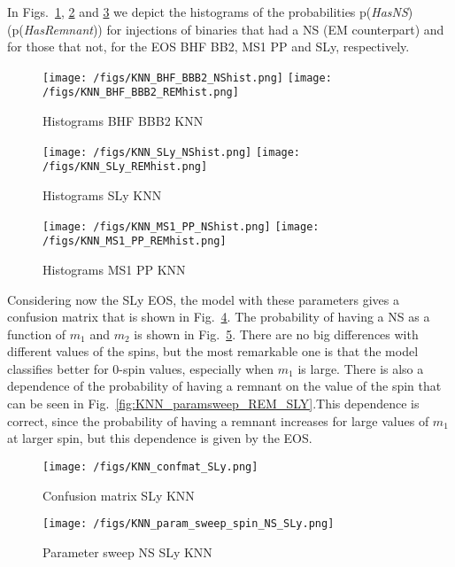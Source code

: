 

In Figs.~\ref{fig:KNN_hist_BHFBBB2}, \ref{fig:KNN_hist_SLY} and \ref{fig:KNN_hist_MS1PP}  we depict the histograms of the probabilities p(\textit{HasNS}) (p(\textit{HasRemnant})) for injections of binaries that had a NS (EM counterpart) and for those that not, for the EOS BHF BB2, MS1 PP and SLy, respectively.

\begin{figure}
\centering
\texttt{[image: /figs/KNN\_BHF\_BBB2\_NShist.png]}
\texttt{[image: /figs/KNN\_BHF\_BBB2\_REMhist.png]}
\caption{\label{fig:KNN_hist_BHFBBB2} Histograms BHF BBB2 KNN}
\end{figure}

\begin{figure}
\centering
\texttt{[image: /figs/KNN\_SLy\_NShist.png]}
\texttt{[image: /figs/KNN\_SLy\_REMhist.png]}
\caption{\label{fig:KNN_hist_SLY} Histograms SLy KNN}
\end{figure}

\begin{figure}
\centering
\texttt{[image: /figs/KNN\_MS1\_PP\_NShist.png]}
\texttt{[image: /figs/KNN\_MS1\_PP\_REMhist.png]}
\caption{\label{fig:KNN_hist_MS1PP} Histograms MS1 PP KNN}
\end{figure}

Considering now the SLy EOS,  the model with these parameters gives a confusion matrix that is shown in Fig.~\ref{fig:KNN_confmat_SLY}.  The probability of having a NS as a function of $m_1$ and $m_2$  is shown in Fig.~\ref{fig:KNN_paramsweep_NS_SLY}. There are no big differences with different values of the spins, but the most remarkable one is that the model classifies better for 0-spin values, especially when $m_1$ is large.  There is also a dependence of the probability of having a remnant on the value of the spin that can be seen in Fig.~\ref{fig:KNN_paramsweep_REM_SLY}.This dependence is correct, since the probability of having a remnant increases for large values of $m_1$ at larger spin, but this dependence is given by the EOS. 

\begin{figure}
\centering
\texttt{[image: /figs/KNN\_confmat\_SLy.png]}
\caption{\label{fig:KNN_confmat_SLY} Confusion matrix SLy KNN}
\end{figure}

\begin{figure}
\centering
\texttt{[image: /figs/KNN\_param\_sweep\_spin\_NS\_SLy.png]}
\caption{\label{fig:KNN_paramsweep_NS_SLY} Parameter sweep NS SLy KNN}
\end{figure}

